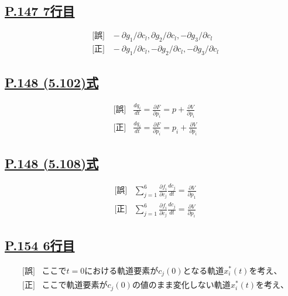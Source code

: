 \documentclass[9pt,fleqn]{bxjsarticle}
\begin{document}
\subsection*{\underline{P.147 7行目}}
\begin{align*}
    &\text{[誤]} \hspace{10pt} - {\partial}g_1/{\partial}c_l, {\partial}g_2/{\partial}c_l, -{\partial}g_3/{\partial}c_l \\
    &\text{[正]} \hspace{10pt} - {\partial}g_1/{\partial}c_l, -{\partial}g_2/{\partial}c_l, -{\partial}g_3/{\partial}c_l 
\end{align*}

\subsection*{\underline{P.148 (5.102)式}}
\begin{align*}
    &\text{[誤]} \hspace{10pt} \frac{dq_i}{dt} = \frac{{\partial}F}{{\partial}p_i} = p + \frac{{\partial}V}{{\partial}p_i} \\
    &\text{[正]} \hspace{10pt} \frac{dq_i}{dt} = \frac{{\partial}F}{{\partial}p_i} = p_i + \frac{{\partial}V}{{\partial}p_i} 
\end{align*}

\subsection*{\underline{P.148 (5.108)式}}
\begin{align*}
    &\text{[誤]} \hspace{10pt} \sum_{j=1}^{6}\frac{{\partial}f_i}{{\partial}c_j}\frac{dc_j}{dt} = \frac{{\partial}V}{{\partial}p_1} \\
    &\text{[正]} \hspace{10pt} \sum_{j=1}^{6}\frac{{\partial}f_i}{{\partial}c_j}\frac{dc_j}{dt} = \frac{{\partial}V}{{\partial}p_i} 
\end{align*}

\subsection*{\underline{P.154 6行目}}
\begin{align*}
    &\text{[誤]} \hspace{10pt} \text{ここで}t=0\text{における軌道要素が}c_j(0)\text{となる軌道}x_i^*(t)\text{を考え、} \\
    &\text{[正]} \hspace{10pt} \text{ここで軌道要素が}c_j(0)\text{の値のまま変化しない軌道}x_i^*(t)\text{を考え、} 
\end{align*}
\end{document}
